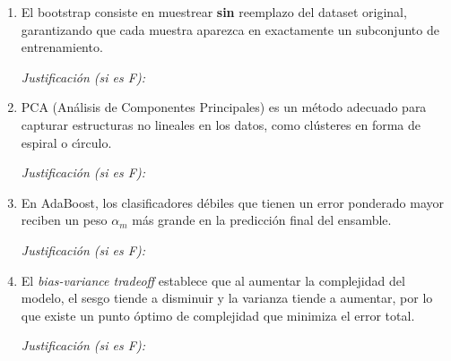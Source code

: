 \documentclass[11pt,a4paper]{article}
\begin{document}
\begin{enumerate}[label=\textbf{\arabic*.}, leftmargin=*, itemsep=18pt]
\vspace{0.2cm}
\underline{\hspace{14cm}}

\item \underline{\hspace{1cm}} El bootstrap consiste en muestrear \textbf{sin} reemplazo del dataset original, garantizando que cada muestra aparezca en exactamente un subconjunto de entrenamiento.

\vspace{0.5cm}
\noindent\textit{Justificaci\'on (si es F):} \underline{\hspace{12cm}}

\vspace{0.2cm}
\underline{\hspace{14cm}}

\item \underline{\hspace{1cm}} PCA (An\'alisis de Componentes Principales) es un m\'etodo adecuado para capturar estructuras no lineales en los datos, como cl\'usteres en forma de espiral o c\'ırculo.

\vspace{0.5cm}
\noindent\textit{Justificaci\'on (si es F):} \underline{\hspace{12cm}}

\vspace{0.2cm}
\underline{\hspace{14cm}}

\item \underline{\hspace{1cm}} En AdaBoost, los clasificadores d\'ebiles que tienen un error ponderado mayor reciben un peso $\alpha_m$ m\'as grande en la predicci\'on final del ensamble.

\vspace{0.5cm}
\noindent\textit{Justificaci\'on (si es F):} \underline{\hspace{12cm}}

\vspace{0.2cm}
\underline{\hspace{14cm}}

\item \underline{\hspace{1cm}} El \textit{bias-variance tradeoff} establece que al aumentar la complejidad del modelo, el sesgo tiende a disminuir y la varianza tiende a aumentar, por lo que existe un punto \'optimo de complejidad que minimiza el error total.

\vspace{0.5cm}
\noindent\textit{Justificaci\'on (si es F):} \underline{\hspace{12cm}}

\vspace{0.2cm}
\underline{\hspace{14cm}}

\end{enumerate}
\end{document}
